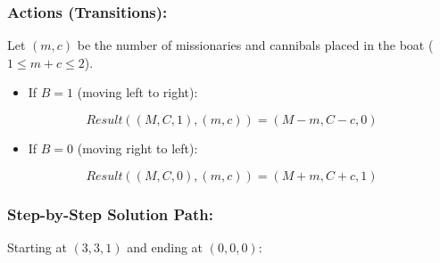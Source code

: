 \subsubsection{Actions (Transitions):}
Let $(m, c)$ be the number of missionaries and cannibals placed in the boat ($1 \le m+c \le 2$).
\begin{itemize}
  \item   If $B = 1$ (moving left to right):
\end{itemize}
    \[ Result((M, C, 1), (m, c)) = (M-m, C-c, 0) \]
\begin{itemize}
  \item   If $B = 0$ (moving right to left):
\end{itemize}
    \[ Result((M, C, 0), (m, c)) = (M+m, C+c, 1) \]

\subsubsection{Step-by-Step Solution Path:}
Starting at $(3, 3, 1)$ and ending at $(0, 0, 0)$:

